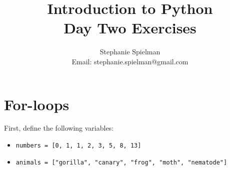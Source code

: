 \documentclass{article}[12pt]
\newcommand{\code}[1]{\texttt{#1}}  %
\begin{document}
\title{Introduction to Python \\ Day Two Exercises}
\author{Stephanie Spielman \\ \footnotesize{Email: stephanie.spielman@gmail.com}}
\date{}
\maketitle{}


\section{For-loops}

First, define the following variables: 
\begin{itemize}
    \item \code{numbers = [0, 1, 1, 2, 3, 5, 8, 13]}
    \item \code{animals = ["gorilla", "canary", "frog", "moth", "nematode"]}
\end{itemize}
\end{document}
